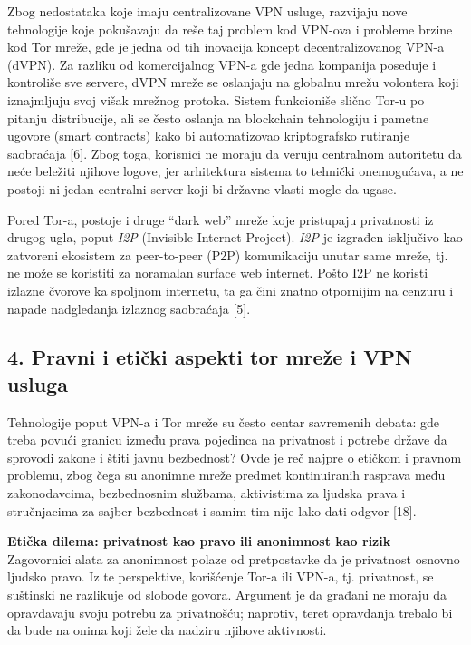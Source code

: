 \documentclass[
]{article}
\begin{document}
Zbog nedostataka koje imaju centralizovane VPN usluge, razvijaju nove
tehnologije koje pokušavaju da reše taj problem kod VPN-ova i probleme
brzine kod Tor mreže, gde je jedna od tih inovacija koncept
decentralizovanog VPN-a (dVPN). Za razliku od komercijalnog VPN-a gde
jedna kompanija poseduje i kontroliše sve servere, dVPN mreže se
oslanjaju na globalnu mrežu volontera koji iznajmljuju svoj višak
mrežnog protoka. Sistem funkcioniše slično Tor-u po pitanju
distribucije, ali se često oslanja na blockchain tehnologiju i pametne
ugovore (smart contracts) kako bi automatizovao kriptografsko rutiranje
saobraćaja {[}6{]}. Zbog toga, korisnici ne moraju da veruju centralnom
autoritetu da neće beležiti njihove logove, jer arhitektura sistema to
tehnički onemogućava, a ne postoji ni jedan centralni server koji bi
državne vlasti mogle da ugase.

Pored Tor-a, postoje i druge ``dark web'' mreže koje pristupaju
privatnosti iz drugog ugla, poput \emph{I2P} (Invisible Internet
Project). \emph{I2P} je izgrađen isključivo kao zatvoreni ekosistem za
peer-to-peer (P2P) komunikaciju unutar same mreže, tj. ne može se
koristiti za noramalan surface web internet. Pošto I2P ne koristi
izlazne čvorove ka spoljnom internetu, ta ga čini znatno otpornijim na
cenzuru i napade nadgledanja izlaznog saobraćaja {[}5{]}.

\hypertarget{pravni-i-etiux10dki-aspekti-tor-mreux17ee-i-vpn-usluga}{%
\subsection{4. Pravni i etički aspekti tor mreže i VPN
usluga}\label{pravni-i-etiux10dki-aspekti-tor-mreux17ee-i-vpn-usluga}}

Tehnologije poput VPN-a i Tor mreže su često centar savremenih debata:
gde treba povući granicu između prava pojedinca na privatnost i potrebe
države da sprovodi zakone i štiti javnu bezbednost? Ovde je reč najpre o
etičkom i pravnom problemu, zbog čega su anonimne mreže predmet
kontinuiranih rasprava među zakonodavcima, bezbednosnim službama,
aktivistima za ljudska prava i stručnjacima za sajber-bezbednost i samim
tim nije lako dati odgvor {[}18{]}.

\textbf{Etička dilema: privatnost kao pravo ili anonimnost kao rizik}\\
Zagovornici alata za anonimnost polaze od pretpostavke da je privatnost
osnovno ljudsko pravo. Iz te perspektive, korišćenje Tor-a ili VPN-a,
tj. privatnost, se suštinski ne razlikuje od slobode govora. Argument je
da građani ne moraju da opravdavaju svoju potrebu za privatnošću;
naprotiv, teret opravdanja trebalo bi da bude na onima koji žele da
nadziru njihove aktivnosti.
\end{document}
